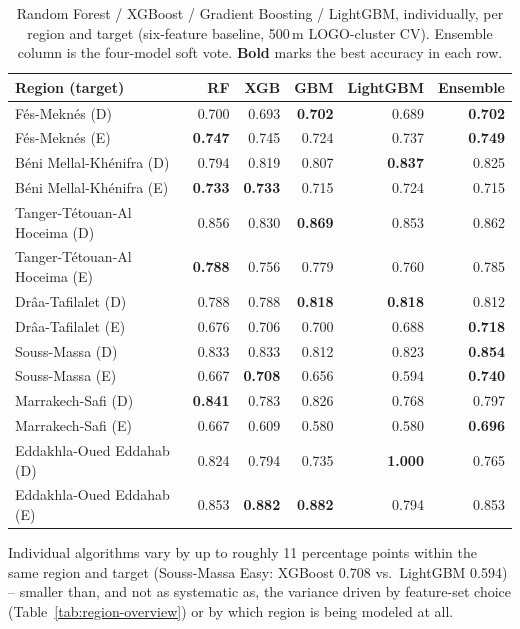 \documentclass[11pt,a4paper]{article}
\begin{document}
\begin{table}[H]
\centering\footnotesize
\caption{Random Forest / XGBoost / Gradient Boosting / LightGBM, individually, per region and target (six-feature baseline, 500\,m LOGO-cluster CV). Ensemble column is the four-model soft vote. \textbf{Bold} marks the best accuracy in each row.}
\label{tab:per-algorithm}
\begin{tabular}{@{}lrrrrr@{}}
\toprule
Region (target) & RF & XGB & GBM & LightGBM & Ensemble \\
\midrule
Fés-Meknés (D) & 0.700 & 0.693 & \textbf{0.702} & 0.689 & \textbf{0.702} \\
Fés-Meknés (E) & \textbf{0.747} & 0.745 & 0.724 & 0.737 & \textbf{0.749} \\
Béni Mellal-Khénifra (D) & 0.794 & 0.819 & 0.807 & \textbf{0.837} & 0.825 \\
Béni Mellal-Khénifra (E) & \textbf{0.733} & \textbf{0.733} & 0.715 & 0.724 & 0.715 \\
Tanger-Tétouan-Al Hoceima (D) & 0.856 & 0.830 & \textbf{0.869} & 0.853 & 0.862 \\
Tanger-Tétouan-Al Hoceima (E) & \textbf{0.788} & 0.756 & 0.779 & 0.760 & 0.785 \\
Drâa-Tafilalet (D) & 0.788 & 0.788 & \textbf{0.818} & \textbf{0.818} & 0.812 \\
Drâa-Tafilalet (E) & 0.676 & 0.706 & 0.700 & 0.688 & \textbf{0.718} \\
Souss-Massa (D) & 0.833 & 0.833 & 0.812 & 0.823 & \textbf{0.854} \\
Souss-Massa (E) & 0.667 & \textbf{0.708} & 0.656 & 0.594 & \textbf{0.740} \\
Marrakech-Safi (D) & \textbf{0.841} & 0.783 & 0.826 & 0.768 & 0.797 \\
Marrakech-Safi (E) & 0.667 & 0.609 & 0.580 & 0.580 & \textbf{0.696} \\
Eddakhla-Oued Eddahab (D) & 0.824 & 0.794 & 0.735 & \textbf{1.000} & 0.765 \\
Eddakhla-Oued Eddahab (E) & 0.853 & \textbf{0.882} & \textbf{0.882} & 0.794 & 0.853 \\
\bottomrule
\end{tabular}

\vspace{2pt}
\end{table}

Individual algorithms vary by up to roughly 11 percentage points within the same region and target (Souss-Massa Easy: XGBoost 0.708 vs.\ LightGBM 0.594) -- smaller than, and not as systematic as, the variance driven by feature-set choice (Table~\ref{tab:region-overview}) or by which region is being modeled at all.
\end{document}
